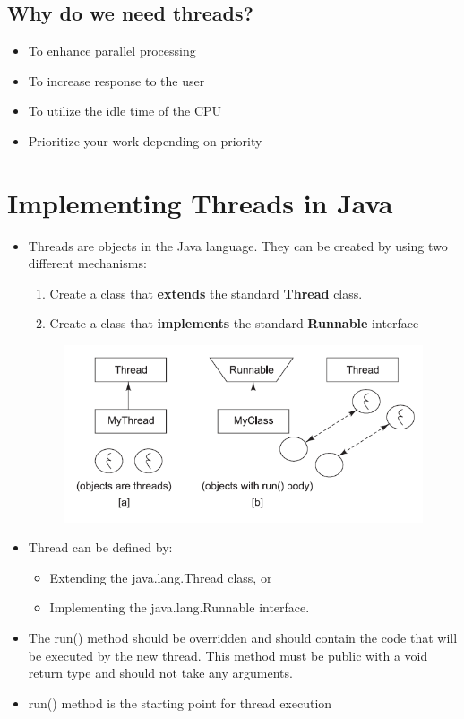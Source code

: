 \documentclass[12pt, a4paper]{book}
\begin{document}
\subsection{Why do we need threads?}
\begin{itemize}
    \item To  enhance parallel processing
    \item To increase response to the user
    \item To utilize the idle time of the CPU
    \item Prioritize your work depending on priority
\end{itemize}
\section{Implementing Threads in Java}
\begin{itemize}
    \item Threads are objects in the Java language. They can be created by using two different mechanisms:
          \begin{enumerate}
              \item Create a class that \textbf{extends} the standard \textbf{Thread} class.
              \item Create a class that \textbf{implements} the standard \textbf{Runnable} interface
          \end{enumerate}
          \begin{figure}[!h]
              \centering
              \includegraphics[width=0.8\linewidth]{figures/threads-in-java.png}
          \end{figure}

    \item Thread can be defined by:
          \begin{itemize}
              \item Extending the java.lang.Thread class, or
              \item Implementing the java.lang.Runnable interface.
          \end{itemize}
    \item The run() method should be overridden and should contain the code that will be executed by the new thread.
          This method must be public with a void return type and should not take any arguments.
    \item run() method is the starting point for thread execution
\end{itemize}
\end{document}
